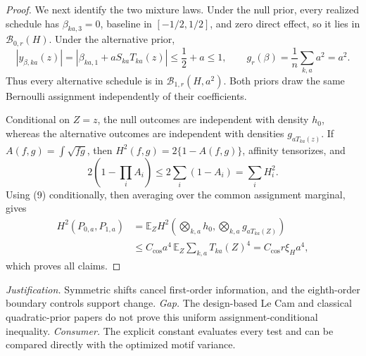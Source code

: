 \documentclass{article}
\begin{document}
\begin{proof}
We next identify the two mixture laws.  Under the null prior, every realized schedule has \(\beta_{ka,3}=0\), baseline in \([-1/2,1/2]\), and zero direct effect, so it lies in \(\mathcal B_{0,r}(H)\).  Under the alternative prior,
\[
|y_{\beta,ka}(z)|=|\beta_{ka,1}+aS_{ka}T_{ka}(z)|\le\frac12+a\le1,
\qquad
g_r(\beta)=\frac1n\sum_{k,a}a^2=a^2.
\]
Thus every alternative schedule is in \(\mathcal B_{1,r}(H,a^2)\).  Both priors draw the same Bernoulli assignment independently of their coefficients.

Conditional on \(Z=z\), the null outcomes are independent with density \(h_0\), whereas the alternative outcomes are independent with densities \(g_{aT_{ka}(z)}\).  If \(A(f,g)=\int\sqrt{fg}\), then \(H^2(f,g)=2\{1-A(f,g)\}\), affinity tensorizes, and
\[
2\left(1-\prod_iA_i\right)\le2\sum_i(1-A_i)=\sum_iH_i^2.
\]
Using (9) conditionally, then averaging over the common assignment marginal, gives
\[
\begin{aligned}
H^2(P_{0,a},P_{1,a})
&=\mathbb E_Z H^2\left(\bigotimes_{k,a}h_0,
\bigotimes_{k,a}g_{aT_{ka}(Z)}\right)\\
&\le C_{\cos}a^4\,
\mathbb E_Z\sum_{k,a}T_{ka}(Z)^4
=C_{\cos}r\xi_Ha^4,
\end{aligned}
\]
which proves all claims.
\end{proof}
\par\smallskip\noindent \textit{Justification.} Symmetric shifts cancel first-order information, and the eighth-order boundary controls support change. \textit{Gap.} The design-based Le Cam and classical quadratic-prior papers do not prove this uniform assignment-conditional inequality. \textit{Consumer.} The explicit constant evaluates every test and can be compared directly with the optimized motif variance.
\end{document}
